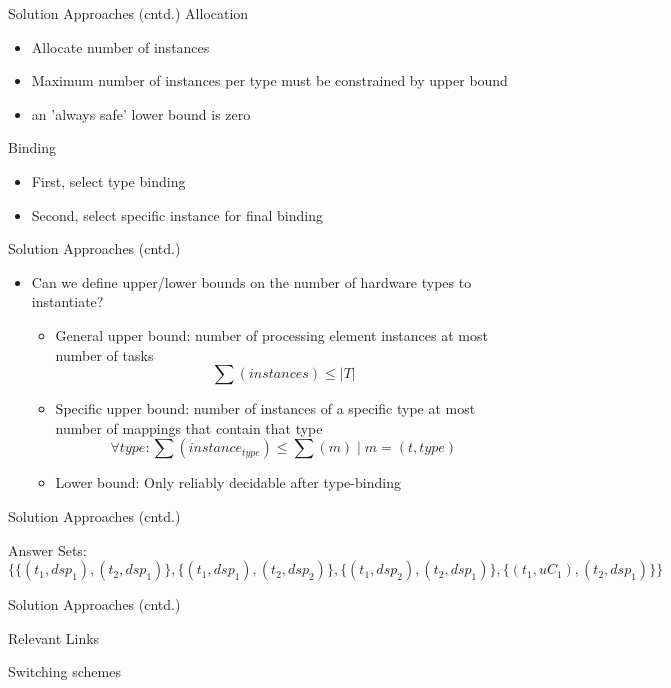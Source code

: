 \documentclass[11pt]{beamer}
\begin{document}
\begin{frame}{Solution Approaches (cntd.)}
    Allocation
  \begin{itemize} 
     \item Allocate number of instances
     \item Maximum number of instances per type must be constrained by upper bound
     \item an 'always safe' lower bound is zero
  \end{itemize}

  Binding
  \begin{itemize} 
     \item First, select type binding 
     \item Second, select specific instance for final binding
  \end{itemize}
\end{frame}

\begin{frame}{Solution Approaches (cntd.)}
  \label{slide:bounds}
  \begin{itemize} 
    \item Can we define upper/lower bounds on the number of hardware types to instantiate?
    \begin{itemize}
      \item General upper bound: number of processing element instances at most number of tasks \[\sum(instances)\leq \vert T\vert\]
      \item Specific upper bound: number of instances of a specific type at most number of mappings that contain that type \[\forall type: \sum(instance_{type}) \leq \sum(m)\mid m=(t, type)\]
      \item Lower bound: Only reliably decidable after type-binding
    \end{itemize}
  \end{itemize}
\end{frame}

\begin{frame}[fragile]{Solution Approaches (cntd.)}
  
   Answer Sets:
  {\tiny
  \[\{\{(t_1,dsp_1),(t_2,dsp_1)\},\{(t_1,dsp_1),(t_2,dsp_2)\},\{(t_1,dsp_2),(t_2,dsp_1)\},\{(t_1,uC_1),(t_2,dsp_1)\}\}\]
  }
\end{frame}

\begin{frame}{Solution Approaches (cntd.)}
  
\end{frame}


\begin{frame}{Relevant Links}
\end{frame}

\begin{frame}{Switching schemes}
\end{frame}
\end{document}
